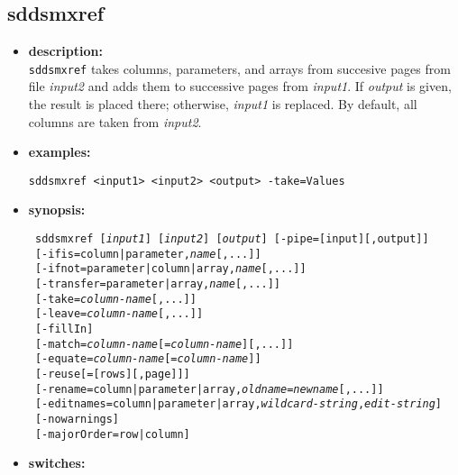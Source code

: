 \newpage 
\subsection{sddsmxref} 
\label{sddsmxref} 
 
\begin{itemize} 
\item {\bf description:} \hspace*{1mm}\\ 
{\tt sddsmxref} takes columns, parameters, and arrays from succesive pages from file {\em input2} and adds them to successive pages from {\em input1}. If {\em output} is given, the result is placed there; otherwise, {\em input1} is replaced. By default, all columns are taken from {\em input2}.
\item {\bf examples:} 
\begin{flushleft}
{\tt sddsmxref <input1> <input2> <output> -take=Values }
\end{flushleft} 
\item {\bf synopsis:}  
\begin{flushleft}
{\tt 
sddsmxref [{\em input1}] [{\em input2}] [{\em output}] [-pipe=[input][,output]] \\ \
[-ifis={column|parameter},{\em name}[,...]] \\ \
[-ifnot={parameter|column|array},{\em name}[,...]] \\ \
[-transfer={parameter|array},{\em name}[,...]] \\ \
[-take={\em column-name}[,...]]  \\ \
[-leave={\em column-name}[,...]] \\ \
[-fillIn] \\ \
[-match={\em column-name}[={\em column-name}][,...]] \\ \
[-equate={\em column-name}[={\em column-name}]]  \\ \
[-reuse[=[rows][,page]]] \\ \
[-rename={column|parameter|array},{\em oldname}={\em newname}[,...]] \\ \
[-editnames={column|parameter|array},{\em wildcard-string},{\em edit-string}] \\ \
[-nowarnings] \\ \
[-majorOrder=row|column]}
\end{flushleft} 
\item {\bf switches:} 
    \begin{itemize} 

\end{itemize}
\end{itemize}
